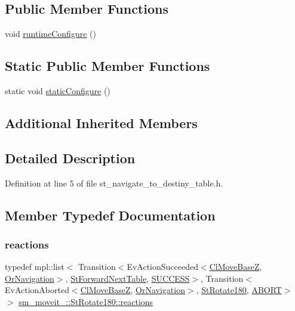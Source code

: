 \subsection*{Public Member Functions}
\begin{DoxyCompactItemize}
\item 
void \hyperlink{structsm__moveit__4_1_1StRotate180_ae75dd5d227f546702062f89c9cada37b}{runtime\+Configure} ()
\end{DoxyCompactItemize}
\subsection*{Static Public Member Functions}
\begin{DoxyCompactItemize}
\item 
static void \hyperlink{structsm__moveit__4_1_1StRotate180_a53828ab6d27fb2517a6abe72e2c9d7d2}{static\+Configure} ()
\end{DoxyCompactItemize}
\subsection*{Additional Inherited Members}


\subsection{Detailed Description}


Definition at line 5 of file st\+\_\+navigate\+\_\+to\+\_\+destiny\+\_\+table.\+h.



\subsection{Member Typedef Documentation}
\mbox{\label{structsm__moveit__4_1_1StRotate180_a7e808c96dc3c1c7aa16e2fa1dd5820fb}} 
\subsubsection{\texorpdfstring{reactions}{reactions}}
{\footnotesize\ttfamily typedef mpl\+::list$<$ Transition$<$Ev\+Action\+Succeeded$<$\hyperlink{classcl__move__base__z_1_1ClMoveBaseZ}{Cl\+Move\+BaseZ}, \hyperlink{classsm__moveit__4_1_1OrNavigation}{Or\+Navigation}$>$, \hyperlink{structsm__moveit__4_1_1StForwardNextTable}{St\+Forward\+Next\+Table}, \hyperlink{classSUCCESS}{S\+U\+C\+C\+E\+SS}$>$, Transition$<$Ev\+Action\+Aborted$<$\hyperlink{classcl__move__base__z_1_1ClMoveBaseZ}{Cl\+Move\+BaseZ}, \hyperlink{classsm__moveit__4_1_1OrNavigation}{Or\+Navigation}$>$, \hyperlink{structsm__moveit__4_1_1StRotate180}{St\+Rotate180}, \hyperlink{classABORT}{A\+B\+O\+RT}$>$ $>$ \hyperlink{structsm__moveit__4_1_1StRotate180_a7e808c96dc3c1c7aa16e2fa1dd5820fb}{sm\+\_\+moveit\+\_\+::\+St\+Rotate180\+::reactions}}



